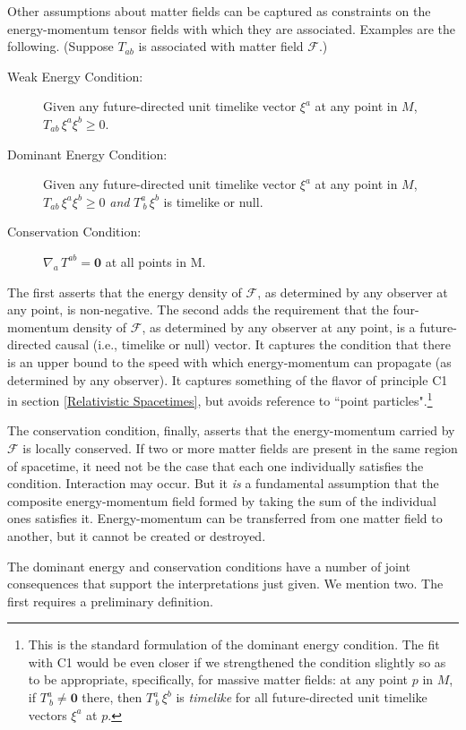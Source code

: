 \documentclass [12] {article}
\theoremstyle{plain}
\numberwithin{figure}{subsection}
\numberwithin{proposition}{subsection}
\begin{document}
Other assumptions about matter fields can be captured as constraints on the energy-momentum tensor fields with which they are associated. Examples are the following. (Suppose $T_{ab}$ is associated with matter field $\mathcal{F}$.)
%
\vspace{-.5em}
\begin{description}
\item [Weak Energy Condition:]  Given any future-directed unit timelike vector $\xi^a$ at any point in $M$,  $T_{ab} \, \xi^a \xi^b \geq 0$. 
\item[Dominant Energy Condition:] Given any future-directed unit timelike vector $\xi^a$ at any point in $M$,  $T_{ab}\,  \xi^a \xi^b \geq 0$ \emph{and} $T^a_{\ b} \, \xi^b $  is timelike or null.    
\item[Conservation Condition:]  $\nabla_a \, T^{ab} = \mathbf{0}$ at all points in M. 
\end{description} 
%
\noindent The first asserts that the energy density of $\mathcal{F}$, as determined by any observer at any point, is non-negative. The second adds the requirement that the four-momentum density of  $\mathcal{F}$, as determined by any observer at any point, is a future-directed causal (i.e., timelike or  null) vector.  It captures the condition that there is an upper bound to the speed with which energy-momentum can propagate (as determined by any observer).  It captures something of the flavor of principle C1 in section \ref{Relativistic  Spacetimes}, but avoids reference to ``point particles".\footnote{This is the standard formulation of the dominant energy condition. The fit with C1 would be even closer if we strengthened the condition slightly so as to be appropriate, specifically, for massive  matter fields:  at any point $p$ in $M$, if  $T^a_{\ b}  \neq \textbf{0} $ there, then  $T^a_{\ b} \, \xi^b $  is \emph{timelike} for all  future-directed unit timelike vectors $\xi^a$ at $p$.}

The conservation condition, finally,  asserts that the energy-momentum carried by $\mathcal{F}$ is locally conserved.  If two  or more matter fields are present in the same region of spacetime, it need not be the case that each one individually satisfies the condition. Interaction may occur.  But it \emph{is} a fundamental assumption that the composite energy-momentum field formed by taking the sum of the individual ones satisfies it.  Energy-momentum can  be transferred from one matter field to another, but it cannot  be created or destroyed.  

The dominant energy and conservation conditions have a number of joint consequences that support the interpretations just given. We mention two. The first requires a preliminary definition.  
\end{document}
